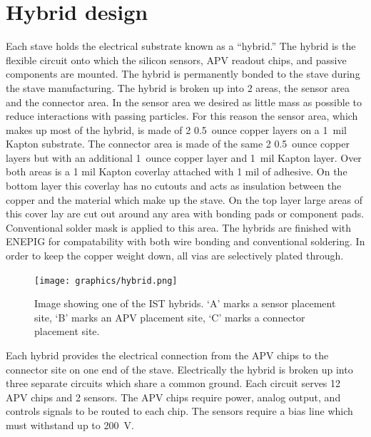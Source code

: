 \documentclass[preprint,12pt]{elsarticle}
\begin{document}
\section{Hybrid design}
Each stave holds the electrical substrate known as a ``hybrid.''  The hybrid is
the flexible circuit onto which the silicon sensors, APV readout chips, and passive
components are mounted. The hybrid is permanently bonded to the stave during
the stave manufacturing. The hybrid is broken up into 2 areas, the sensor area
and the connector area. In the sensor
area we desired as little mass as possible to reduce interactions with passing
particles. For this reason the sensor area, which makes up most of the hybrid,
is made of 2 0.5~ounce copper layers on a 1~mil Kapton substrate. The connector
area is made of the same 2 0.5~ounce copper layers but with an additional
1~ounce copper layer and 1~mil Kapton layer. Over both areas is a 1 mil Kapton
coverlay attached with 1 mil of adhesive. On the bottom layer this coverlay has
no cutouts and acts as insulation between the copper and the material which make
up the stave. On the top layer large areas of this cover lay are cut out around
any area with bonding pads or component pads. Conventional solder mask is
applied to this area. The hybrids are finished with ENEPIG for compatability
with both wire bonding and conventional soldering. In order to keep the copper
weight down, all vias are selectively plated through.

\begin{figure}[h]
\begin{center}
\texttt{[image: graphics/hybrid.png]}
\caption{Image showing one of the IST hybrids. `A' marks a sensor placement site,
`B' marks an APV placement site, `C' marks a connector placement site.
\label{fig:hybrid}}
\end{center}
\end{figure}

Each hybrid provides the electrical connection from the APV chips to the
connector site on one end of the stave. Electrically the hybrid is broken up
into three separate circuits which share a common ground. Each circuit
serves 12 APV chips and 2 sensors. The APV chips require power, analog output,
and controls signals to be routed to each chip. The sensors require a bias line
which must withstand up to 200~V.
\end{document}
